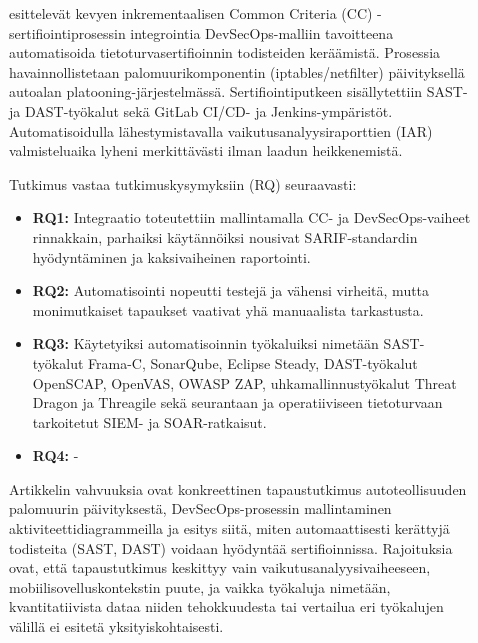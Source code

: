 \documentclass[bscthesis,finnish,oneside,biblatex]{uefcsthesis}
\begin{document}
\begin{description}
    \item[\cite{dupont2021_incremental}] esittelevät kevyen inkrementaalisen Common Criteria (CC) -sertifiointiprosessin integrointia DevSecOps-malliin tavoitteena automatisoida tietoturvasertifioinnin todisteiden keräämistä. Prosessia havainnollistetaan palomuurikomponentin (iptables/netfilter) päivityksellä autoalan platooning-järjestelmässä. Sertifiointiputkeen sisällytettiin SAST- ja DAST-työkalut sekä GitLab CI/CD- ja Jenkins-ympäristöt. Automatisoidulla lähestymistavalla vaikutusanalyysiraporttien (IAR) valmisteluaika lyheni merkittävästi ilman laadun heikkenemistä.

    Tutkimus vastaa tutkimuskysymyksiin (RQ) seuraavasti:
    \begin{itemize}
        \item \textbf{RQ1:} Integraatio toteutettiin mallintamalla CC- ja DevSecOps-vaiheet rinnakkain, parhaiksi käytännöiksi nousivat SARIF-standardin hyödyntäminen ja kaksivaiheinen raportointi.
        \item \textbf{RQ2:} Automatisointi nopeutti testejä ja vähensi virheitä, mutta monimutkaiset tapaukset vaativat yhä manuaalista tarkastusta.
        \item \textbf{RQ3:} Käytetyiksi automatisoinnin työkaluiksi nimetään SAST-työkalut Frama-C, SonarQube, Eclipse Steady, DAST-työkalut OpenSCAP, OpenVAS, OWASP ZAP, uhkamallinnustyökalut Threat Dragon ja Threagile sekä seurantaan ja operatiiviseen tietoturvaan tarkoitetut SIEM- ja SOAR-ratkaisut.
        \item \textbf{RQ4:} -
    \end{itemize}

    Artikkelin vahvuuksia ovat konkreettinen tapaustutkimus autoteollisuuden palomuurin päivityksestä, DevSecOps-prosessin mallintaminen aktiviteettidiagrammeilla  ja esitys siitä, miten automaattisesti kerättyjä todisteita (SAST, DAST) voidaan hyödyntää sertifioinnissa. Rajoituksia ovat, että tapaustutkimus keskittyy vain vaikutusanalyysivaiheeseen, mobiilisovelluskontekstin puute, ja vaikka työkaluja nimetään, kvantitatiivista dataa niiden tehokkuudesta tai vertailua eri työkalujen välillä ei esitetä yksityiskohtaisesti.
\end{description}
\end{document}
